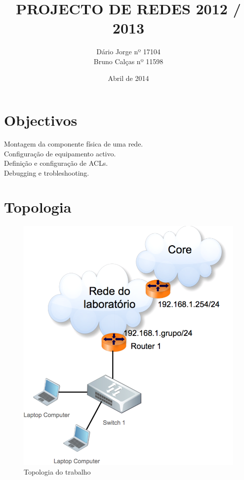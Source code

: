 \documentclass[a4paper,titlepage]{article}
\title{PROJECTO DE REDES 2012 / 2013}
\author{
	Dário Jorge  nº 17104\\
	Bruno Calças nº 11598\\
}
\date{Abril de 2014}
\begin{document}
	\maketitle
	
	\newpage
	
	\tableofcontents
	
	\newpage
	
	\section{Objectivos}
		Montagem da componente física de uma rede.\\
		Configuração de equipamento activo.\\
		Definição e configuração de ACLs.\\
		Debugging e trobleshooting.\\
	\section{Topologia}
			\begin{figure}[H]
									\centering
									\includegraphics[width=\linewidth]{topologia.png}
									\caption{Topologia do trabalho}
			\end{figure}
\end{document}

